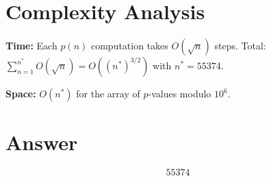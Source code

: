 \documentclass[11pt]{article}
\begin{document}
\section{Complexity Analysis}

\textbf{Time:} Each $p(n)$ computation takes $O(\sqrt{n})$ steps. Total: $\sum_{n=1}^{n^*} O(\sqrt{n}) = O((n^*)^{3/2})$ with $n^* = 55374$.

\textbf{Space:} $O(n^*)$ for the array of $p$-values modulo $10^6$.

\section{Answer}

\[
\boxed{55374}
\]
\end{document}
